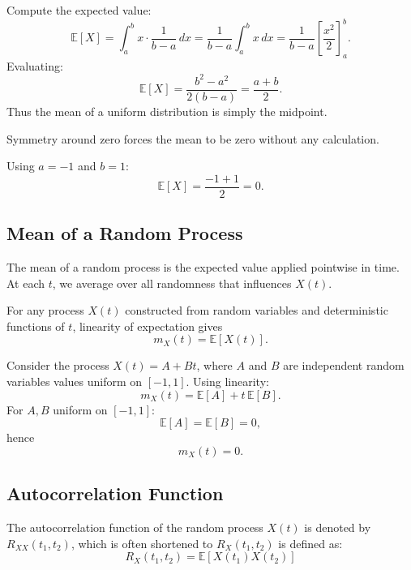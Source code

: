 \begin{derivation}
	Compute the expected value:
	\[
		\mathbb{E}[X]
		= \int_a^b x \cdot \frac{1}{b-a}\, dx
		= \frac{1}{b-a}\int_a^b x\, dx
		= \frac{1}{b-a}\left[\frac{x^2}{2}\right]_{a}^{b}.
	\]
	Evaluating:
	\[
		\mathbb{E}[X] = \frac{b^2 - a^2}{2(b-a)} = \frac{a+b}{2}.
	\]
	Thus the mean of a uniform distribution is simply the midpoint.
\end{derivation}

\begin{idea}
	Symmetry around zero forces the mean to be zero without any calculation.
\end{idea}

\begin{examplebox}

	Using $a=-1$ and $b=1$:
	\[
		\mathbb{E}[X] = \frac{-1 + 1}{2} = 0.
	\]

\end{examplebox}


\subsection{Mean of a Random Process}


\begin{idea}
	The mean of a random process is the expected value applied
	pointwise in time. At each $t$, we average over all randomness
	that influences $X(t)$.
\end{idea}

For any process $X(t)$ constructed from random variables
and deterministic functions of $t$, linearity of expectation gives
\begin{equation}\label{eq:meanofprocess}
	m_X(t) = \mathbb{E}[X(t)].
\end{equation}

\begin{examplebox}[label=exa:uniform]
	Consider the process $X(t) = A + Bt$, where $A$ and $B$
	are independent random variables values uniform on \([-1,1]\).
	Using linearity:
	\[
		m_X(t) = \mathbb{E}[A] + t\,\mathbb{E}[B].
	\]
	For $A, B$ uniform on $[-1,1]$:
	\[
		\mathbb{E}[A] = \mathbb{E}[B] = 0,
	\]
	hence
	\[
		m_X(t) = 0.
	\]
\end{examplebox}


\subsection{Autocorrelation Function}
The autocorrelation function of the random process \(X(t)\) is denoted by
\(R_{XX}(t_1,t_2)\), which is often shortened to \(R_X(t_1,t_2)\) is defined as:
\begin{equation}\label{eq:autocorrelation}
	R_X(t_1,t_2) = \mathbb{E}[X(t_1)X(t_2)]
\end{equation}

